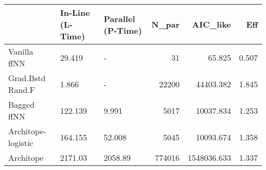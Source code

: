 \begin{tabular}{lllrrr}
\toprule
{} & In-Line (L-Time) & Parallel (P-Time) &   N\_par &     AIC\_like &    Eff \\
\midrule
Vanilla ffNN       &           29.419 &                 - &      31 &       65.825 &  0.507 \\
Grad.Bstd Rand.F   &            1.866 &                 - &   22200 &    44403.382 &  1.845 \\
Bagged ffNN        &          122.139 &             9.991 &    5017 &    10037.834 &  1.253 \\
Architope-logistic &          164.155 &            52.008 &    5045 &    10093.674 &  1.358 \\
Architope          &          2171.03 &           2058.89 &  774016 &  1548036.633 &  1.337 \\
\bottomrule
\end{tabular}
